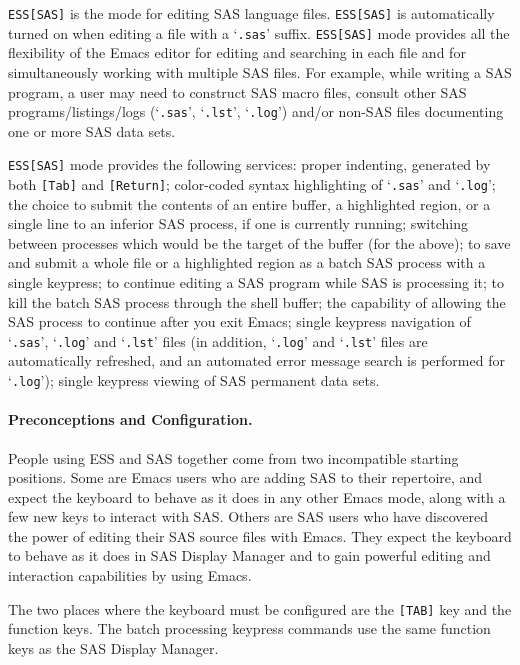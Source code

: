 \documentclass{article}
\newcommand{\stexttt}[1]{{\small\texttt{#1}}}
\newcommand{\file}[1]{`\stexttt{#1}'}
\begin{document}
\stexttt{ESS[SAS]} is the mode for editing SAS language files.
\stexttt{ESS[SAS]} is automatically turned on when editing a file with
a \file{.sas} suffix.  \stexttt{ESS[SAS]} mode provides all the
flexibility of the Emacs editor for editing and searching in each file
and for simultaneously working with multiple SAS files.  For example,
while writing a SAS program, a user may need to construct SAS macro
files, consult other SAS programs/listings/logs (\file{.sas}, \file{.lst},
\file{.log}) and/or non-SAS files documenting one or more SAS data sets.

\stexttt{ESS[SAS]} mode provides the following services: proper
indenting, generated by both \stexttt{[Tab]} and \stexttt{[Return]};
color-coded syntax highlighting of \file{.sas} and \file{.log}; the
choice to submit the contents of an entire buffer, a highlighted
region, or a single line to an inferior SAS process, if one is
currently running; switching between processes which would be the
target of the buffer (for the above); to save and submit a whole file
or a highlighted region as a batch SAS process with a single keypress;
to continue editing a SAS program while SAS is processing it; to kill
the batch SAS process through the shell buffer; the capability of
allowing the SAS process to continue after you exit Emacs; single
keypress navigation of \file{.sas}, \file{.log} and \file{.lst} files
(in addition, \file{.log} and \file{.lst} files are automatically
refreshed, and an automated error message search is performed for
\file{.log}); single keypress viewing of SAS permanent data sets.

\paragraph{Preconceptions and Configuration.}

People using ESS and SAS together come from two incompatible starting
positions.  Some are Emacs users who are adding SAS to their
repertoire, and expect the keyboard to behave as it does in any other
Emacs mode, along with a few new keys to interact with SAS.  Others
are SAS users who have discovered the power of editing their SAS
source files with Emacs.  They expect the keyboard to behave as it
does in SAS Display Manager and to gain
powerful editing and interaction capabilities by using Emacs.

The two places where the keyboard must be configured are the
\texttt{[TAB]} key and the function keys.  The batch processing
keypress commands use the same function keys as the SAS Display
Manager.
\end{document}
